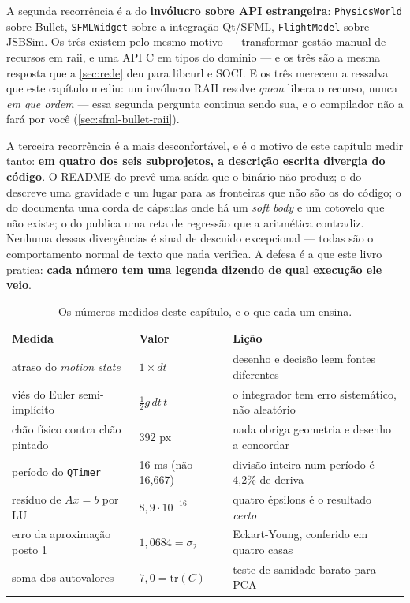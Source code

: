 A segunda recorrência é a do \textbf{invólucro sobre API estrangeira}:
\texttt{PhysicsWorld} sobre Bullet, \texttt{SFMLWidget} sobre a integração
Qt/SFML, \texttt{FlightModel} sobre JSBSim. Os três existem pelo mesmo motivo
--- transformar gestão manual de recursos em \gls{raii}, e uma API C em tipos do
domínio --- e os três são a mesma resposta que a \cref{sec:rede} deu para
libcurl e SOCI. E os três merecem a ressalva que este capítulo mediu: um
invólucro RAII resolve \emph{quem} libera o recurso, nunca \emph{em que ordem}
--- essa segunda pergunta continua sendo sua, e o compilador não a fará por você
(\cref{sec:sfml-bullet-raii}).

A terceira recorrência é a mais desconfortável, e é o motivo de este capítulo
medir tanto: \textbf{em quatro dos seis subprojetos, a descrição escrita
divergia do código}. O README do  prevê uma saída que o
binário não produz; o do  descreve uma gravidade e um
lugar para as fronteiras que não são os do código; o do 
documenta uma corda de cápsulas onde há um \emph{soft body} e um cotovelo que
não existe; o do  publica uma reta de regressão que a
aritmética contradiz. Nenhuma dessas divergências é sinal de descuido
excepcional --- todas são o comportamento normal de texto que nada verifica. A
defesa é a que este livro pratica: \textbf{cada número tem uma legenda dizendo
de qual execução ele veio}.

\begin{table}[htbp]
\centering
\caption{Os números medidos deste capítulo, e o que cada um ensina.}
\label{tab:cap8-medidas}
\footnotesize
\begin{tabular}{@{}llp{}@{}}
\toprule
\textbf{Medida} & \textbf{Valor} & \textbf{Lição} \\
\midrule
atraso do \emph{motion state}   & $1 \times dt$        & desenho e decisão leem fontes diferentes \\
viés do Euler semi-implícito    & $\tfrac{1}{2}g\,dt\,t$ & o integrador tem erro sistemático, não aleatório \\
chão físico contra chão pintado & 392 px               & nada obriga geometria e desenho a concordar \\
período do \texttt{QTimer}      & 16 ms (não 16,667)   & divisão inteira num período é 4,2\% de deriva \\
resíduo de $Ax=b$ por LU        & $8{,}9\cdot10^{-16}$ & quatro épsilons é o resultado \emph{certo} \\
erro da aproximação posto 1     & $1{,}0684 = \sigma_2$& Eckart-Young, conferido em quatro casas \\
soma dos autovalores            & $7{,}0 = \mathrm{tr}(C)$ & teste de sanidade barato para PCA \\
\bottomrule
\end{tabular}
\end{table}

